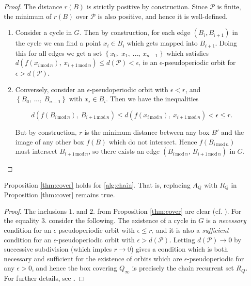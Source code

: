 \begin{proof}
    The distance $r(B)$ is strictly positive by construction. Since $\mathcal{P}$ is 
    finite, the minimum of $r(B)$ over $\mathcal{P}$ is also positive, and hence 
    it is well-defined. 

    \begin{enumerate}
        \item Consider a cycle in $G$. Then by construction, for each edge $(B_i, B_{i+1})$ 
        in the cycle we can find a point $x_i \in B_i$ which gets mapped into $B_{i+1}$. 
        Doing this for all edges we get a set $\left\{ x_0,\ x_1,\ \ldots,\ x_{n-1} \right\}$ 
        which satisfies 
        $d(f(x_{i\, \text{mod}\, n}),\ x_{i+1\, \text{mod}\, n}) \leq d(\mathcal{P}) < \epsilon$, 
        ie an $\epsilon$-pseudoperiodic orbit for $\epsilon > d(\mathcal{P})$. 
        \item Conversely, consider an $\epsilon$-pseudoperiodic orbit with $\epsilon < r$, 
        and $\left\{ B_0,\ \ldots,\ B_{n-1} \right\}$ with $x_i \in B_i$. 
        Then we have the inequalities 

        \begin{equation}
            d(f(B_{i\, \text{mod}\, n}),\ B_{i+1\, \text{mod}\, n}) \leq
            d(f(x_{i\, \text{mod}\, n}),\ x_{i+1\, \text{mod}\, n}) <
            \epsilon \leq r.
        \end{equation}

        But by construction, $r$ is the minimum distance between any box $B'$ and the image 
        of any other box $f(B)$ which do not intersect. Hence 
        $f(B_{i\, \text{mod}\, n})$ must intersect $B_{i+1\, \text{mod}\, n}$, so there 
        exists an edge $(B_{i\, \text{mod}\, n},\, B_{i+1\, \text{mod}\, n})$ in $G$. 
    \end{enumerate}
\end{proof}

\begin{corollary}
    Proposition \ref{thm:cover} holds for \autoref{alg:chain}. That is, replacing $A_Q$ 
    with $R_Q$ in Proposition \ref{thm:cover} remains true. 
\end{corollary}

\begin{proof}
    The inclusions $1.$ and $2.$ from Proposition \ref{thm:cover} are clear (cf. 
    \cite*{dynbook}). For the equality $3.$ consider the following. 
    The existence of a cycle in $G$ is a \emph{necessary} condition for an
    $\epsilon$-pseudoperiodic orbit with $\epsilon \leq r$, and it is also a 
    \emph{sufficient} condition for an $\epsilon$-pseudoperiodic orbit with 
    $\epsilon > d(\mathcal{P})$. Letting $d(\mathcal{P}) \to 0$ by successive subdivision 
    (which imples $r \to 0$) gives a condition which is both necessary and sufficient for 
    the existence of orbits which are $\epsilon$-pseudoperiodic for any $\epsilon > 0$, 
    and hence the box covering $Q_\infty$ is precisely the chain recurrent set $R_Q$. For 
    further details, see \cite*{chain,dynbook}. 
\end{proof}

